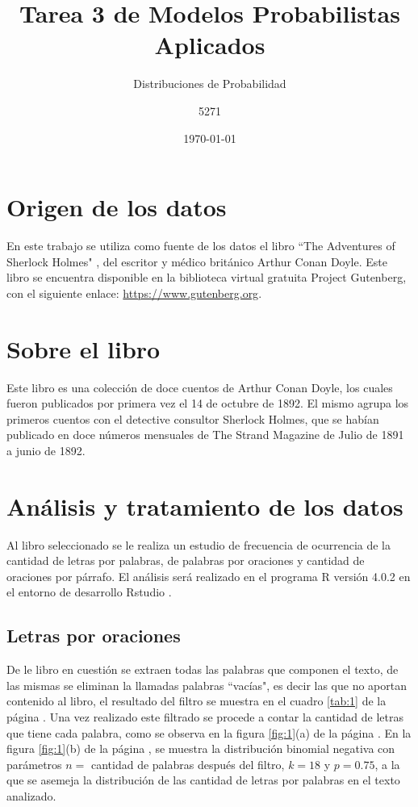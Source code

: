 \documentclass{article}
\title{Tarea 3 de Modelos Probabilistas Aplicados}
\subtitle{Distribuciones de Probabilidad}
\author{5271}
\date{\today}
\begin{document}
\maketitle

\section{Origen de los datos}

En este trabajo se utiliza como fuente de los datos el libro ``The Adventures of Sherlock Holmes" \cite{Holmes92}, del escritor y médico británico Arthur Conan Doyle. Este libro se encuentra disponible en la biblioteca virtual gratuita Project Gutenberg, con el siguiente enlace: \href{https://www.gutenberg.org}{https://www.gutenberg.org}. 

\section{Sobre el libro}

Este libro es una colección de doce cuentos de Arthur Conan Doyle, los cuales fueron publicados por primera vez el 14 de octubre de 1892. El mismo agrupa los primeros cuentos con el detective consultor Sherlock Holmes, que se habían publicado en doce números mensuales de The Strand Magazine de Julio de 1891 a junio de 1892. 

\section{Análisis y tratamiento de los datos}

Al libro seleccionado se le realiza un estudio de frecuencia de ocurrencia de la cantidad de letras por palabras, de palabras por oraciones y cantidad de oraciones por párrafo. El análisis será realizado en el programa R versión 4.0.2 \cite{r} en el entorno de desarrollo Rstudio \cite{rstudio}. 

\subsection{Letras por oraciones}
De le libro en cuestión se extraen todas las palabras que componen el texto, de las mismas se eliminan la llamadas palabras ``vacías", es decir las que no aportan contenido al libro, el resultado del filtro se muestra en el cuadro \ref{tab:1} de la página \pageref{tab:1}. Una vez realizado este filtrado se procede a contar la cantidad de letras que tiene cada palabra, como se observa en la figura \ref{fig:1}(a) de la página \pageref{fig:a}. En la figura \ref{fig:1}(b) de la página \pageref{fig:b}, se muestra la distribución binomial negativa con parámetros $n = $ cantidad de palabras después del filtro, $k = 18$ y $p = 0.75 $, a la que se asemeja la distribución de las cantidad de letras por palabras en el texto analizado.
\end{document}

